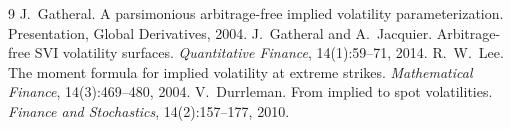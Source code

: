 \documentclass[11pt]{article}
\begin{document}
\begin{thebibliography}{9}
 J.~Gatheral. A parsimonious arbitrage-free implied
volatility parameterization. Presentation, Global Derivatives, 2004.
 J.~Gatheral and A.~Jacquier. Arbitrage-free SVI
volatility surfaces. \emph{Quantitative Finance}, 14(1):59--71, 2014.
 R.~W.~Lee. The moment formula for implied volatility at extreme
strikes. \emph{Mathematical Finance}, 14(3):469--480, 2004.
 V.~Durrleman. From implied to spot volatilities.
\emph{Finance and Stochastics}, 14(2):157--177, 2010.
\end{thebibliography}
\end{document}
